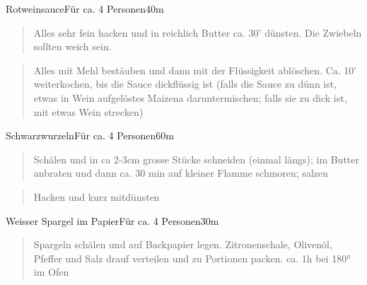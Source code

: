 \documentclass[
  a4paper,
]{article}
\begin{document}
\begin{recipe}{Rotweinsauce}{Für ca. 4 Personen}{40m}


\begin{quote}
Alles sehr fein hacken und in reichlich Butter ca. 30' dünsten. Die
Zwiebeln sollten weich sein.
\end{quote}

\freeform\hrulefill


\begin{quote}
Alles mit Mehl bestäuben und dann mit der Flüssigkeit ablöschen. Ca. 10'
weiterkochen, bis die Sauce dickflüssig ist (falls die Sauce zu dünn
ist, etwas in Wein aufgelöstes Maizena daruntermischen; falls sie zu
dick ist, mit etwas Wein strecken)
\end{quote}

\freeform\hrulefill\newline\freeform{}\end{recipe}

\newpage

\begin{recipe}{Schwarzwurzeln}{Für ca. 4 Personen}{60m}


\begin{quote}
Schälen und in ca 2-3cm grosse Stücke schneiden (einmal längs); im
Butter anbraten und dann ca. 30 min auf kleiner Flamme schmoren; salzen
\end{quote}

\freeform\hrulefill


\begin{quote}
Hacken und kurz mitdünsten
\end{quote}

\freeform\hrulefill\newline\freeform{}\end{recipe}

\newpage

\begin{recipe}{Weisser Spargel im Papier}{Für ca. 4 Personen}{30m}


\begin{quote}
Spargeln schälen und auf Backpapier legen. Zitronenschale, Olivenöl,
Pfeffer und Salz drauf verteilen und zu Portionen packen. ca. 1h bei
180° im Ofen
\end{quote}

\freeform\hrulefill\newline\freeform{}\end{recipe}
\end{document}
